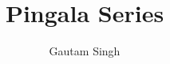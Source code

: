 \documentclass[journal,12pt,twocolumn]{IEEEtran}
\begin{document}
\renewcommand{\thefigure}{\arabic{section}.\arabic{figure}}
\makeatletter
{}
\makeatother


\def\putbox#1#2#3{\makebox[0in][l]{\makebox[#1][l]{}\raisebox{\baselineskip}[0in][0in]{\raisebox{#2}[0in][0in]{#3}}}}
     \def\rightbox#1{\makebox[0in][r]{#1}}
     \def\centbox#1{\makebox[0in]{#1}}
     \def\topbox#1{\raisebox{-\baselineskip}[0in][0in]{#1}}
     \def\midbox#1{\raisebox{-0.5\baselineskip}[0in][0in]{#1}}

\vspace{3cm}

\title{ 
Pingala Series
}


%
%
%

\author{Gautam Singh}
% 
%
\end{document}
